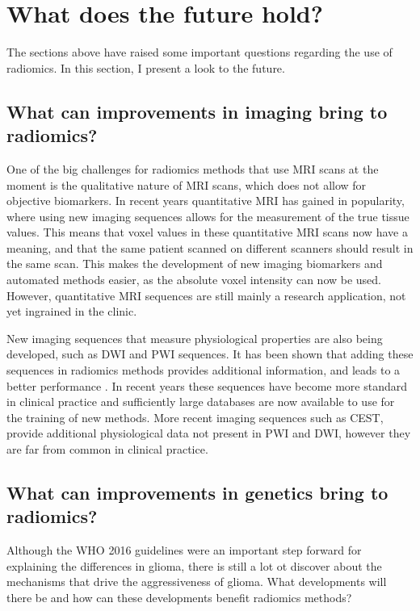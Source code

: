 \section{What does the future hold?}\label{sec:discussion_future}

The sections above have raised some important questions regarding the use of radiomics.
In this section, I present a look to the future.


\subsection{What can improvements in imaging bring to radiomics?}\label{sec:dicussion_new_imaging}

One of the big challenges for radiomics methods that use \gls{MRI} scans at the moment is the qualitative nature of \gls{MRI} scans, which does not allow for objective biomarkers.
In recent years quantitative \gls{MRI} has gained in popularity, where using new imaging sequences allows for the measurement of the true tissue values.
This means that voxel values in these quantitative \gls{MRI} scans now have a meaning, and that the same patient scanned on different scanners should result in the same scan.
This makes the development of new imaging biomarkers and automated methods easier, as the absolute voxel intensity can now be used.
However, quantitative \gls{MRI} sequences are still mainly a research application, not yet ingrained in the clinic.

New imaging sequences that measure physiological properties are also being developed, such as \gls{DWI} and \gls{PWI} sequences.
It has been shown that adding these sequences in radiomics methods provides additional information, and leads to a better performance \autocite{park2020radiomicsdwi,kim2020radiomicsdwi}.
In recent years these sequences have become more standard in clinical practice and sufficiently large databases are now available to use for the training of new methods.
More recent imaging sequences such as \gls{CEST}, provide additional physiological data not present in \gls{PWI} and \gls{DWI}, however they are far from common in clinical practice.



\subsection{What can improvements in genetics bring to radiomics?}\label{sec:discussion_new_genetics}
Although the \gls{WHO} 2016 guidelines were an important step forward for explaining the differences in glioma, there is still a lot ot discover about the mechanisms that drive the aggressiveness of glioma.
What developments will there be and how can these developments benefit radiomics methods?

